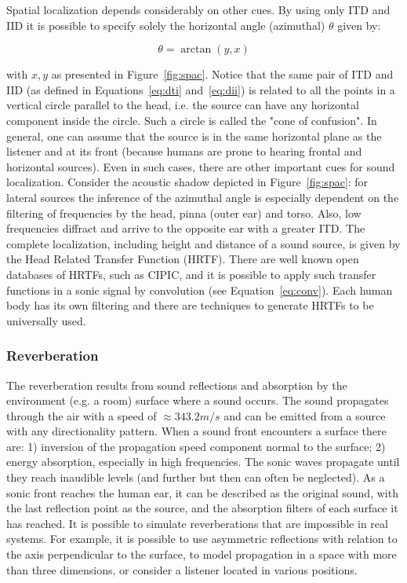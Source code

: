 Spatial localization depends considerably on other cues.
By using only ITD and IID it is possible to specify solely
the horizontal angle (azimuthal) $\theta$ given by:

\begin{equation}\label{eq:angulo}
\theta=\arctan( y, x )
\end{equation}

\noindent with $x,y$ as presented in Figure~\ref{fig:spac}.
Notice that
the same pair of ITD and IID (as defined in Equations~\ref{eq:dti} and~\ref{eq:dii})
is related to all the points in a vertical circle parallel to
the head, i.e. the source can have any horizontal component inside the circle.
Such a circle is called the "cone of confusion".
In general, one can assume that the source is in the same horizontal plane
as the listener and at its front
(because humans are prone to hearing frontal and horizontal sources).
Even in such cases, there are other important cues for sound localization.
Consider the acoustic shadow depicted in Figure~\ref{fig:spac}:
for lateral sources the inference of the azimuthal angle is especially dependent
on the filtering of frequencies by the head, pinna (outer ear) and torso.
Also, low frequencies diffract and arrive to the opposite ear with a greater ITD. 
The complete localization, including height and distance of a sound source,
is given by the Head Related Transfer Function (HRTF).
There are well known open databases of HRTFs, such as CIPIC,
and it is possible to apply such transfer functions in a sonic 
signal by convolution (see Equation~\ref{eq:conv}).
Each human body has its own filtering and there are techniques 
to generate HRTFs to be universally used.~\cite{lazaSPA,CIPIC,floEsp,Heeger,hrtf} 

\subsubsection{Reverberation}
The reverberation results from sound reflections and absorption by the environment (e.g. a room) surface where a sound occurs.
The sound propagates through the air with a speed of $\approx 343.2m/s$ and can be emitted from a source with any directionality pattern. When a sound front encounters a surface there are: 1) inversion of the propagation speed component normal to the surface;  2) energy absorption, especially in high frequencies.
The sonic waves propagate until they reach inaudible levels (and further but then can often be neglected).
As a sonic front reaches the human ear, it can be described as the original sound, with the last reflection point as the source, and the absorption filters of each surface it has reached.
It is possible to simulate reverberations that are impossible in real systems.
For example, it is possible to use asymmetric reflections with relation to the axis perpendicular to the surface,
to model propagation in a space with more than three dimensions,
or consider a listener located in various positions.

